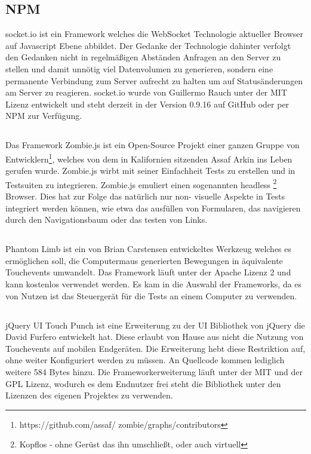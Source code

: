 	\subsection{NPM }
	socket.io ist ein Framework welches die WebSocket Technologie aktueller Browser auf Javascript Ebene abbildet. Der Gedanke 	der Technologie dahinter verfolgt den Gedanken nicht in regelmäßigen Abständen Anfragen an den Server zu stellen und damit 	unnötig viel Datenvolumen zu generieren, sondern eine permanente Verbindung zum Server aufrecht zu halten um auf 			Statusänderungen am Server zu reagieren. socket.io wurde von Guillermo Rauch unter der MIT Lizenz entwickelt und steht 		derzeit in der Version 0.9.16 auf GitHub oder per NPM zur Verfügung.
	
	\subsection{}
	Das Framework Zombie.js ist ein Open-Source Projekt einer ganzen Gruppe von Entwicklern\footnote{https://github.com/assaf/	zombie/graphs/contributors}, welches von dem in Kalifornien sitzenden Assaf Arkin ins Leben gerufen wurde. Zombie.js wirbt mit 	seiner Einfachheit Tests zu erstellen und in Testsuiten zu integrieren. Zombie.js emuliert einen sogenannten headless			\footnote{Kopflos - ohne Gerüst das ihn umschließt, oder auch virtuell} Browser. Dies hat zur Folge das natürlich nur non-		visuelle Aspekte in Tests integriert werden können, wie etwa das ausfüllen von Formularen, das navigieren durch den 			Navigationsbaum oder das testen von Links.

	\subsection{}
	Phantom Limb ist ein von Brian Carstensen entwickeltes Werkzeug welches es ermöglichen soll, die Computermaus generierten 	Bewegungen in äquivalente \mbox{Touchevents} umwandelt. Das Framework läuft unter der Apache Lizenz 2 und kann kostenlos 		verwendet werden. Es kam in die Auswahl der Frameworks, da es von Nutzen ist das Steuergerät für die Tests an einem 			Computer zu verwenden.
	
	\subsection{}
	jQuery UI Touch Punch ist eine Erweiterung zu der UI Bibliothek von jQuery die David Furfero entwickelt hat. Diese erlaubt von 	Hause aus nicht die Nutzung von Touchevents auf mobilen Endgeräten. Die Erweiterung hebt diese Restriktion auf, ohne weiter 	Konfiguriert werden zu müssen. An Quellcode kommen lediglich weitere 584 Bytes hinzu. Die Frameworkerweiterung läuft unter 	der MIT und der GPL Lizenz, wodurch es dem Endnutzer frei steht die Bibliothek unter den Lizenzen des eigenen Projektes zu 		verwenden.
	
